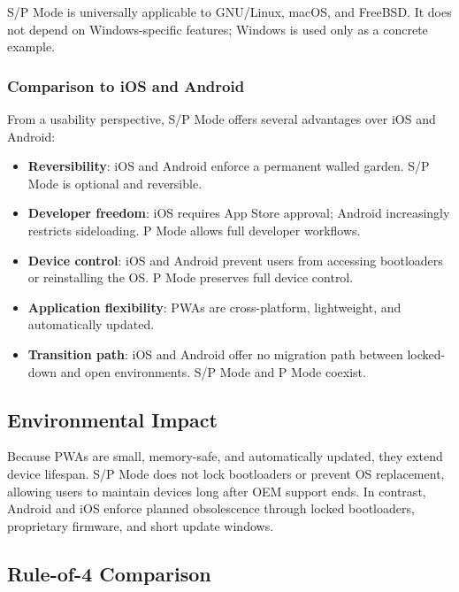 S/P Mode is universally applicable to GNU/Linux, macOS, and FreeBSD. It does not depend on Windows-specific features; Windows is used only as a concrete example.

\subsubsection{Comparison to iOS and Android}

From a usability perspective, S/P Mode offers several advantages over iOS and Android:

\begin{itemize}
    \item \textbf{Reversibility}: iOS and Android enforce a permanent walled garden. S/P Mode is optional and reversible.
    \item \textbf{Developer freedom}: iOS requires App Store approval; Android increasingly restricts sideloading. P Mode allows full developer workflows.
    \item \textbf{Device control}: iOS and Android prevent users from accessing bootloaders or reinstalling the OS. P Mode preserves full device control.
    \item \textbf{Application flexibility}: PWAs are cross-platform, lightweight, and automatically updated.
    \item \textbf{Transition path}: iOS and Android offer no migration path between locked-down and open environments. S/P Mode and P Mode coexist.
\end{itemize}

\subsection{Environmental Impact}

Because PWAs are small, memory-safe, and automatically updated, they extend device lifespan. S/P Mode does not lock bootloaders or prevent OS replacement, allowing users to maintain devices long after OEM support ends. In contrast, Android and iOS enforce planned obsolescence through locked bootloaders, proprietary firmware, and short update windows.

\subsection{Rule-of-4 Comparison}

